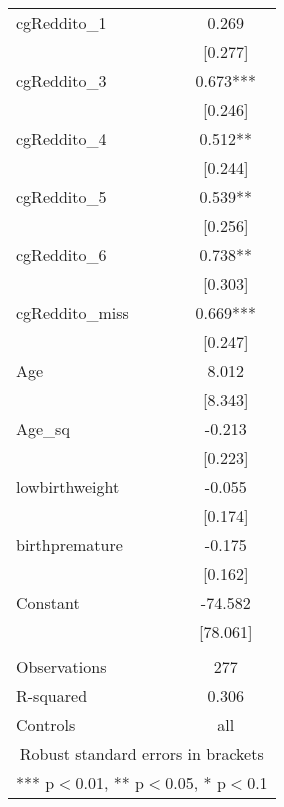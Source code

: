 \documentclass[]{article}
\begin{document}
\begin{tabular}{lc}
cgReddito\_1 & 0.269 \\
 & [0.277] \\
cgReddito\_3 & 0.673*** \\
 & [0.246] \\
cgReddito\_4 & 0.512** \\
 & [0.244] \\
cgReddito\_5 & 0.539** \\
 & [0.256] \\
cgReddito\_6 & 0.738** \\
 & [0.303] \\
cgReddito\_miss & 0.669*** \\
 & [0.247] \\
Age & 8.012 \\
 & [8.343] \\
Age\_sq & -0.213 \\
 & [0.223] \\
lowbirthweight & -0.055 \\
 & [0.174] \\
birthpremature & -0.175 \\
 & [0.162] \\
Constant & -74.582 \\
 & [78.061] \\
 &  \\
Observations & 277 \\
R-squared & 0.306 \\
 Controls & all \\ \hline
\multicolumn{2}{c}{ Robust standard errors in brackets} \\
\multicolumn{2}{c}{ *** p$<$0.01, ** p$<$0.05, * p$<$0.1} \\
\end{tabular}
\end{document}

